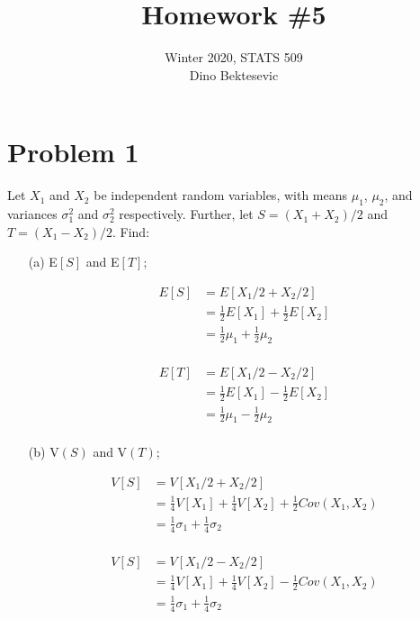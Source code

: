 \documentclass{article}
\date{{}}
\newcommand{\1}{\mathbf{1}}
\begin{document}
\title{Homework \#5}
\author{\normalsize{Winter 2020, STATS 509}\\
\normalsize{Dino Bektesevic}}
\maketitle



\section*{Problem 1}
Let $X_1$ and $X_2$ be independent random variables, with means $\mu_1$, $\mu_2$, and variances $\sigma^2_1$ and $\sigma^2_2$ respectively. Further, let $S = (X_1 + X_2)/2$ and $T = (X_1 - X_2)/2$. Find:
\begin{enumerate}
    \item[(a)] E$[S]$ and E$[T]$;

    \begin{align*}
        E[S] &= E[X_1/2 + X_2/2] \\
        &= \frac{1}{2}E[X_1] + \frac{1}{2}E[X_2] \\
        &= \frac{1}{2}\mu_1 + \frac{1}{2}\mu_2 \\
    \end{align*}
    
    \begin{align*}
        E[T] &= E[X_1/2 - X_2/2] \\
        &= \frac{1}{2}E[X_1] - \frac{1}{2}E[X_2] \\
        &= \frac{1}{2}\mu_1 - \frac{1}{2}\mu_2 \\
    \end{align*}
    
    \item[(b)] V$(S)$ and V$(T)$;

    \begin{align*}
        V[S] &= V[X_1/2 + X_2/2] \\
        &= \frac{1}{4}V[X_1] + \frac{1}{4}V[X_2] + \frac{1}{2}Cov(X_1, X_2)\\
        &= \frac{1}{4}\sigma_1 + \frac{1}{4}\sigma_2 \\
    \end{align*}
    
    \begin{align*}
        V[S] &= V[X_1/2 - X_2/2] \\
        &= \frac{1}{4}V[X_1] + \frac{1}{4}V[X_2] - \frac{1}{2}Cov(X_1, X_2)\\
        &= \frac{1}{4}\sigma_1 + \frac{1}{4}\sigma_2 \\
    \end{align*}


\end{enumerate}
\end{document}
